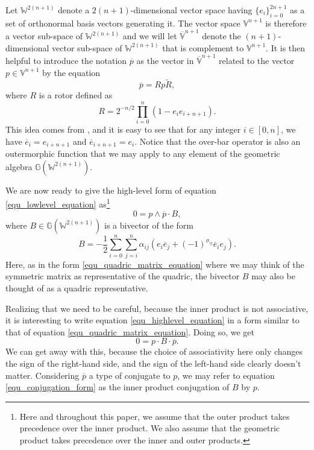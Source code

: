 \documentclass{ecgd-l}
\theoremstyle{definition}
\theoremstyle{remark}
\numberwithin{equation}{section}
\newcommand{\G}{\mathbb{G}}
\newcommand{\V}{\mathbb{V}}
\newcommand{\Vb}{\mathbb{\overline{V}}}
\newcommand{\W}{\mathbb{W}}
\begin{document}
Let $\W^{2(n+1)}$ denote a $2(n+1)$-dimensional vector space
having $\{e_i\}_{i=0}^{2n+1}$ as a set of orthonormal basis vectors
generating it.  The vector space $\V^{n+1}$ is therefore a vector
sub-space of $\W^{2(n+1)}$ and we will let $\Vb^{n+1}$ denote
the $(n+1)$-dimensional vector sub-space of $\W^{2(n+1)}$ that
is complement to $\V^{n+1}$.  It is then helpful to introduce the
notation $\overline{p}$ as the vector in $\Vb^{n+1}$ related to the
vector $p\in\V^{n+1}$ by the equation
\begin{equation}
\overline{p} = Rp\tilde{R},
\end{equation}
where $R$ is a rotor defined as
\begin{equation}
R = 2^{-n/2}\prod_{i=0}^n\left(1-e_ie_{i+n+1}\right).
\end{equation}
This idea comes from \cite{DoranHestenes93}, and it is easy to see
that for any integer $i\in[0,n]$, we have $\overline{e}_i=e_{i+n+1}$
and $\overline{e}_{i+n+1}=e_i$.  Notice that the over-bar operator
is also an outermorphic function that we may apply to any element
of the geometric algebra $\G(\W^{2(n+1)})$.

We are now ready to give the high-level form of equation \eqref{equ_lowlevel_equation}
as\footnote{Here and throughout this paper, we assume that the outer product takes
precedence over the inner product.  We also assume that the geometric product takes
precedence over the inner and outer products.}
\begin{equation}\label{equ_highlevel_equation}
0 = p\wedge\overline{p}\cdot B,
\end{equation}
where $B\in\G(\W^{2(n+1)})$ is a bivector of the form
\begin{equation}
B = -\frac{1}{2}\sum_{i=0}^n\sum_{j=i}^n\alpha_{ij}(e_i\overline{e}_j+(-1)^{\sigma_{ij}}\overline{e}_ie_j).
\end{equation}
Here, as in the form \eqref{equ_quadric_matrix_equation} where we may think of
the symmetric matrix as representative of the quadric, the bivector $B$ may also be thought
of as a quadric representative.

Realizing that we need to be careful, because the inner product is not associative,
it is interesting to write equation \eqref{equ_highlevel_equation} in a form
similar to that of equation \eqref{equ_quadric_matrix_equation}.  Doing so, we get
\begin{equation}\label{equ_conjugation_form}
0 = p\cdot B\cdot\overline{p}.
\end{equation}
We can get away with this, because the choice of associativity here only changes
the sign of the right-hand side, and the sign of the left-hand side clearly doesn't matter.
Considering $\overline{p}$ a type of conjugate to $p$, we may refer to equation
\eqref{equ_conjugation_form} as the inner product conjugation of $B$ by $p$.
\end{document}

